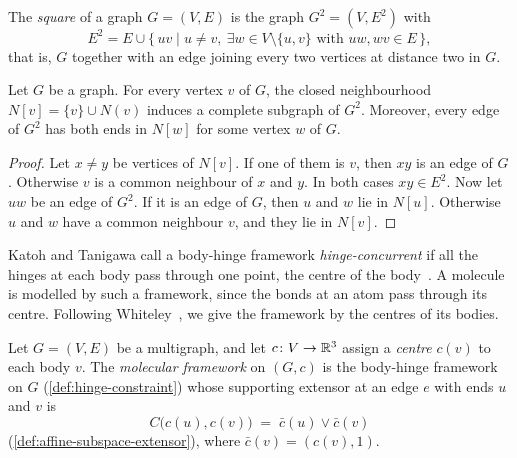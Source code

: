 \begin{definition}
  \label{def:square-graph}
  \leanok
  The \emph{square} of a graph $G = (V,E)$ is the graph
  $G^2 = (V, E^2)$ with
  \[
    E^2 = E \cup \{\, uv \mid u \ne v,\ \exists w \in V \setminus \{u,v\}
      \text{ with } uw, wv \in E \,\},
  \]
  that is, $G$ together with an edge joining every two vertices at
  distance two in $G$.
\end{definition}

\begin{lemma}
  \label{lem:square-cliques}
  \leanok
  Let $G$ be a graph. For every vertex $v$ of $G$, the closed
  neighbourhood $N[v] = \{v\} \cup N(v)$ induces a complete subgraph of
  $G^2$. Moreover, every edge of $G^2$ has both ends in $N[w]$ for some
  vertex $w$ of $G$.
\end{lemma}
\begin{proof}
  \leanok
  Let $x \neq y$ be vertices of $N[v]$. If one of them is $v$, then
  $xy$ is an edge of $G$. Otherwise $v$ is a common neighbour of $x$ and
  $y$. In both cases $xy \in E^2$. Now let $uw$ be an edge of $G^2$. If
  it is an edge of $G$, then $u$ and $w$ lie in $N[u]$. Otherwise $u$
  and $w$ have a common neighbour $v$, and they lie in $N[v]$.
\end{proof}

Katoh and Tanigawa call a body-hinge framework \emph{hinge-concurrent}
if all the hinges at each body pass through one point, the centre of the
body~\cite[p.~650]{katohTanigawa2011}. A molecule is
modelled by such a framework, since the bonds at an atom pass through
its centre. Following Whiteley~\cite[Definition~4]{whiteley1999}, we
give the framework by the centres of its bodies.

\begin{definition}
  \label{def:hinge-concurrent}
  \leanok
  Let $G = (V, E)$ be a multigraph, and let $c \colon V \to {\mathbb{R}}^3$
  assign a \emph{centre} $c(v)$ to each body $v$. The \emph{molecular
  framework} on $(G, c)$ is the body-hinge framework on $G$
  (\cref{def:hinge-constraint}) whose supporting extensor at an edge
  $e$ with ends $u$ and $v$ is
  \[
    C\bigl(c(u), c(v)\bigr) \;=\; \bar c(u) \vee \bar c(v)
  \]
  (\cref{def:affine-subspace-extensor}), where
  $\bar c(v) = (c(v), 1)$.
\end{definition}

